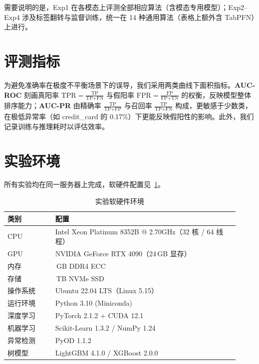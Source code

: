 需要说明的是，Exp1 在各模态上评测全部相应算法（含模态专用模型）；Exp2--Exp4 涉及标签翻转与监督训练，统一在 14 种通用算法（表格上额外含 TabPFN）上进行。

\section{评测指标}

为避免准确率在极度不平衡场景下的误导，我们采用两类曲线下面积指标。\textbf{AUC-ROC} 刻画真阳率 $\text{TPR}=\tfrac{\text{TP}}{\text{TP}+\text{FN}}$ 与假阳率 $\text{FPR}=\tfrac{\text{FP}}{\text{FP}+\text{TN}}$ 的权衡，反映模型整体排序能力；\textbf{AUC-PR} 由精确率 $\tfrac{\text{TP}}{\text{TP}+\text{FP}}$ 与召回率 $\tfrac{\text{TP}}{\text{TP}+\text{FN}}$ 构成，更敏感于少数类，在极低异常率（如 credit\_card 的 0.17\%）下更能反映假阳性的影响。此外，我们记录训练与推理耗时以评估效率。

\section{实验环境}

所有实验均在同一服务器上完成，软硬件配置见~\ref{tab:env-specs}。

\begin{table}[!t]
  \caption{实验软硬件环境}\label{tab:env-specs}
  \centering
  \small
  \begin{tabular}{@{}>{\raggedright\arraybackslash}p{0.19\linewidth}>{\raggedright\arraybackslash}p{0.73\linewidth}@{}}
    \toprule
    \textbf{类别} & \textbf{配置} \\
    \midrule
    CPU      & Intel Xeon Platinum 8352B @ 2.70GHz（32 核 / 64 线程） \\
    GPU      & NVIDIA GeForce RTX 4090（24\,GB 显存） \\
    内存     & 128\,GB DDR4 ECC \\
    存储     & 2\,TB NVMe SSD \\
    \midrule
    操作系统 & Ubuntu 22.04 LTS（Linux 5.15） \\
    运行环境 & Python 3.10 (Miniconda) \\
    深度学习 & PyTorch 2.1.2 + CUDA 12.1 \\
    机器学习 & Scikit-Learn 1.3.2 / NumPy 1.24 \\
    异常检测 & PyOD 1.1.2 \cite{zhao2019pyod} \\
    树模型   & LightGBM 4.1.0 / XGBoost 2.0.0 \\
    \bottomrule
  \end{tabular}
\end{table}
